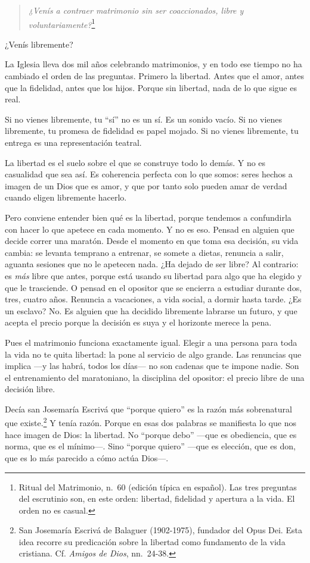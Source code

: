 \begin{quotation}
\textit{¿Venís a contraer matrimonio sin ser coaccionados, libre y voluntariamente?}\footnote{Ritual del Matrimonio, n.~60 (edición típica en español). Las tres preguntas del escrutinio son, en este orden: libertad, fidelidad y apertura a la vida. El orden no es casual.}
\end{quotation}

¿Venís libremente?

La Iglesia lleva dos mil años celebrando matrimonios, y en todo ese tiempo no ha cambiado el orden de las preguntas. Primero la libertad. Antes que el amor, antes que la fidelidad, antes que los hijos. Porque sin libertad, nada de lo que sigue es real.

Si no vienes libremente, tu ``sí'' no es un sí. Es un sonido vacío. Si no vienes libremente, tu promesa de fidelidad es papel mojado. Si no vienes libremente, tu entrega es una representación teatral.

La libertad es el suelo sobre el que se construye todo lo demás. Y no es casualidad que sea así. Es coherencia perfecta con lo que somos: seres hechos a imagen de un Dios que es amor, y que por tanto solo pueden amar de verdad cuando eligen libremente hacerlo.

Pero conviene entender bien qué es la libertad, porque tendemos a confundirla con hacer lo que apetece en cada momento. Y no es eso. Pensad en alguien que decide correr una maratón. Desde el momento en que toma esa decisión, su vida cambia: se levanta temprano a entrenar, se somete a dietas, renuncia a salir, aguanta sesiones que no le apetecen nada. ¿Ha dejado de ser libre? Al contrario: es \emph{más} libre que antes, porque está usando su libertad para algo que ha elegido y que le trasciende. O pensad en el opositor que se encierra a estudiar durante dos, tres, cuatro años. Renuncia a vacaciones, a vida social, a dormir hasta tarde. ¿Es un esclavo? No. Es alguien que ha decidido libremente labrarse un futuro, y que acepta el precio porque la decisión es suya y el horizonte merece la pena.

Pues el matrimonio funciona exactamente igual. Elegir a una persona para toda la vida no te quita libertad: la pone al servicio de algo grande. Las renuncias que implica ---y las habrá, todos los días--- no son cadenas que te impone nadie. Son el entrenamiento del maratoniano, la disciplina del opositor: el precio libre de una decisión libre.

Decía san Josemaría Escrivá que ``porque quiero'' es la razón más sobrenatural que existe.\footnote{San Josemaría Escrivá de Balaguer (1902-1975), fundador del Opus Dei. Esta idea recorre su predicación sobre la libertad como fundamento de la vida cristiana. Cf. \textit{Amigos de Dios}, nn.~24-38.} Y tenía razón. Porque en esas dos palabras se manifiesta lo que nos hace imagen de Dios: la libertad. No ``porque debo'' ---que es obediencia, que es norma, que es el mínimo---. Sino ``porque quiero'' ---que es elección, que es don, que es lo más parecido a cómo actúa Dios---.


